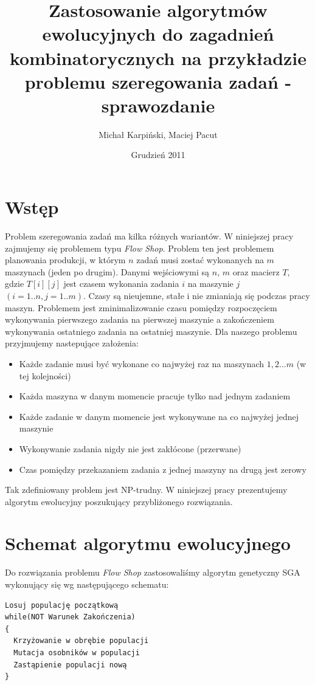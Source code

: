 \documentclass[12pt]{article}
\title{Zastosowanie algorytmów ewolucyjnych do zagadnień
  kombinatorycznych na przykładzie problemu szeregowania zadań - sprawozdanie}
\author{Michał Karpiński, Maciej Pacut}
\date{Grudzień 2011}
\begin{document}
  \maketitle


\section{Wstęp}
Problem szeregowania zadań ma kilka różnych wariantów. W niniejszej pracy zajmujemy się problemem typu {\em Flow Shop}.
Problem ten jest problemem planowania produkcji, w którym $n$ zadań musi zostać wykonanych na $m$ maszynach (jeden po drugim).
Danymi wejściowymi są $n$, $m$ oraz macierz $T$, gdzie $T[i][j]$ jest czasem wykonania zadania $i$ na maszynie $j$ $(i = 1..n, j = 1..m )$.
Czasy są nieujemne, stałe i nie zmianiają się podczas pracy maszyn. Problemem jest zminimalizowanie czasu 
pomiędzy rozpoczęciem wykonywania pierwszego zadania na pierwszej maszynie a zakończeniem wykonywania ostatniego zadania na ostatniej maszynie.
Dla naszego problemu przyjmujemy nastepujące założenia:

\begin{itemize}
  \item Każde zadanie musi być wykonane co najwyżej raz na maszynach $1, 2 ... m$ (w tej kolejności)
  \item Każda maszyna w danym momencie pracuje tylko nad jednym zadaniem
  \item Każde zadanie w danym momencie jest wykonywane na co najwyżej jednej maszynie
  \item Wykonywanie zadania nigdy nie jest zakłócone (przerwane)
  \item Czas pomiędzy przekazaniem zadania z jednej maszyny na drugą jest zerowy
\end{itemize}

Tak zdefiniowany problem jest NP-trudny. W niniejszej pracy prezentujemy algorytm ewolucyjny poszukujący przybliżonego rozwiązania.

\section{Schemat algorytmu ewolucyjnego}

Do rozwiązania problemu {\em Flow Shop} zastosowaliśmy algorytm
genetyczny SGA wykonujący się wg następującego schematu:

\begin{verbatim}
Losuj populację początkową
while(NOT Warunek Zakończenia)
{
  Krzyżowanie w obrębie populacji
  Mutacja osobników w populacji
  Zastąpienie populacji nową
}
\end{verbatim}
\end{document}
